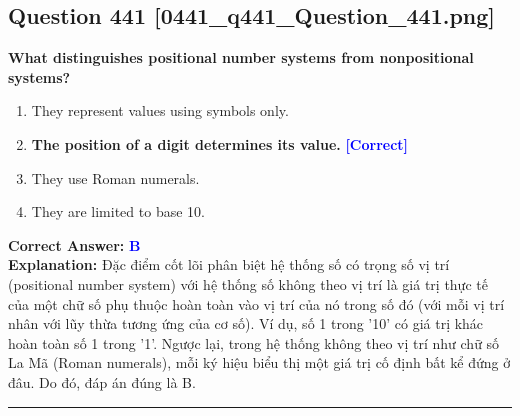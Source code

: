 \documentclass[11pt,a4paper]{article}
\begin{document}
\begin{minipage}{\textwidth}
\subsection*{Question 441 \quad \footnotesize{[0441\_q441\_Question\_441.png]}}
\noindent \textbf{What distinguishes positional number systems from nonpositional systems?}

\begin{enumerate}[label=\Alph*.]
    \item They represent values using symbols only.
    \item \textbf{The position of a digit determines its value.} \hfill \textcolor{blue}{\textbf{[Correct]}}
    \item They use Roman numerals.
    \item They are limited to base 10.
\end{enumerate}

\noindent \textbf{Correct Answer:} \textcolor{blue}{\textbf{B}} \\[2pt]
\noindent \textbf{Explanation:} Đặc điểm cốt lõi phân biệt hệ thống số có trọng số vị trí (positional number system) với hệ thống số không theo vị trí là giá trị thực tế của một chữ số phụ thuộc hoàn toàn vào vị trí của nó trong số đó (với mỗi vị trí nhân với lũy thừa tương ứng của cơ số). Ví dụ, số 1 trong '10' có giá trị khác hoàn toàn số 1 trong '1'. Ngược lại, trong hệ thống không theo vị trí như chữ số La Mã (Roman numerals), mỗi ký hiệu biểu thị một giá trị cố định bất kể đứng ở đâu. Do đó, đáp án đúng là B.

\par\vspace{0.3cm}
\hrule
\vspace{0.3cm}
\end{minipage}
\end{document}

